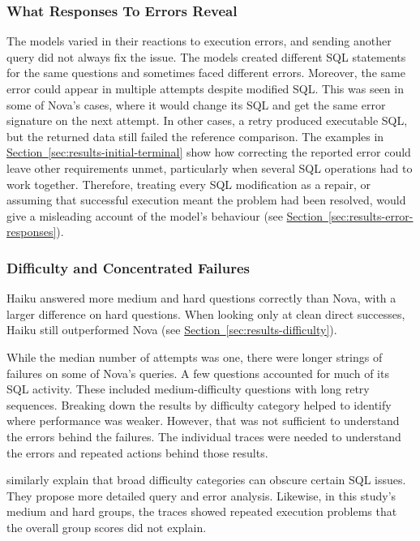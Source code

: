 \subsubsection{What Responses To Errors Reveal}

The models varied in their reactions to execution errors, 
and sending another query did not always fix the issue. 
The models created different SQL statements for the same questions 
and sometimes faced different errors. 
Moreover, the same error could appear in multiple attempts despite modified SQL. 
This was seen in some of Nova's cases, 
where it would change its SQL and get the same error signature on the next attempt. 
In other cases, a retry produced executable SQL,
but the returned data still failed the reference comparison.
The examples in
\hyperref[sec:results-initial-terminal]{Section~\ref*{sec:results-initial-terminal}}
show how correcting the reported error could leave other requirements unmet,
particularly when several SQL operations had to work together. 
Therefore, treating every SQL modification as a repair, 
or assuming that successful execution meant the problem had been resolved, 
would give a misleading account of the model's behaviour 
(see \hyperref[sec:results-error-responses]{Section~\ref*{sec:results-error-responses}}).

\subsubsection{Difficulty and Concentrated Failures}

Haiku answered more medium and hard questions correctly than Nova,
with a larger difference on hard questions.
When looking only at clean direct successes, 
Haiku still outperformed Nova (see \hyperref[sec:results-difficulty]{Section~\ref*{sec:results-difficulty}}).

While the median number of attempts was one, 
there were longer strings of failures on some of Nova's queries. 
A few questions accounted for much of its SQL activity. 
These included medium-difficulty questions with long retry sequences. 
Breaking down the results by difficulty category helped to identify where performance was weaker. 
However, that was not sufficient to understand the errors behind the failures. 
The individual traces were needed to understand the errors and repeated actions behind those results.

\citet{mitsopoulou2025analysis} similarly explain that broad difficulty 
categories can obscure certain SQL issues. 
They propose more detailed query and error analysis. 
Likewise, in this study's medium and hard groups, 
the traces showed repeated execution problems that the overall group scores did not explain.

